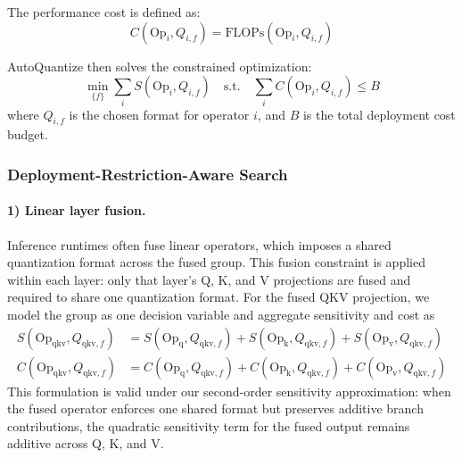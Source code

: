 The performance cost is defined as:
\[
C(\mathrm{Op}_i, Q_{i,f}) = \mathrm{FLOPs}(\mathrm{Op}_i, Q_{i,f})
\]

AutoQuantize then solves the constrained optimization:
\[
\min_{\{f\}} \sum_i S(\mathrm{Op}_i, Q_{i,f}) \quad \mathrm{s.t.} \quad \sum_i C(\mathrm{Op}_i, Q_{i,f}) \leq B
\]
where $Q_{i,f}$ is the chosen format for operator $i$, and $B$ is the total deployment cost budget.

\subsubsection{Deployment-Restriction-Aware Search}

\paragraph{1) Linear layer fusion.}
Inference runtimes often fuse linear operators, which imposes a shared quantization format across the fused group. This fusion constraint is applied within each layer: only that layer's Q, K, and V projections are fused and required to share one quantization format. For the fused QKV projection, we model the group as one decision variable and aggregate sensitivity and cost as
\[
\begin{aligned}
S(\mathrm{Op}_{\mathrm{qkv}}, Q_{\mathrm{qkv},f}) &= S(\mathrm{Op}_{\mathrm{q}}, Q_{\mathrm{qkv},f}) + S(\mathrm{Op}_{\mathrm{k}}, Q_{\mathrm{qkv},f}) + S(\mathrm{Op}_{\mathrm{v}}, Q_{\mathrm{qkv},f}) \\
C(\mathrm{Op}_{\mathrm{qkv}}, Q_{\mathrm{qkv},f}) &= C(\mathrm{Op}_{\mathrm{q}}, Q_{\mathrm{qkv},f}) + C(\mathrm{Op}_{\mathrm{k}}, Q_{\mathrm{qkv},f}) + C(\mathrm{Op}_{\mathrm{v}}, Q_{\mathrm{qkv},f})
\end{aligned}
\]
This formulation is valid under our second-order sensitivity approximation: when the fused operator enforces one shared format but preserves additive branch contributions, the quadratic sensitivity term for the fused output remains additive across Q, K, and V.

